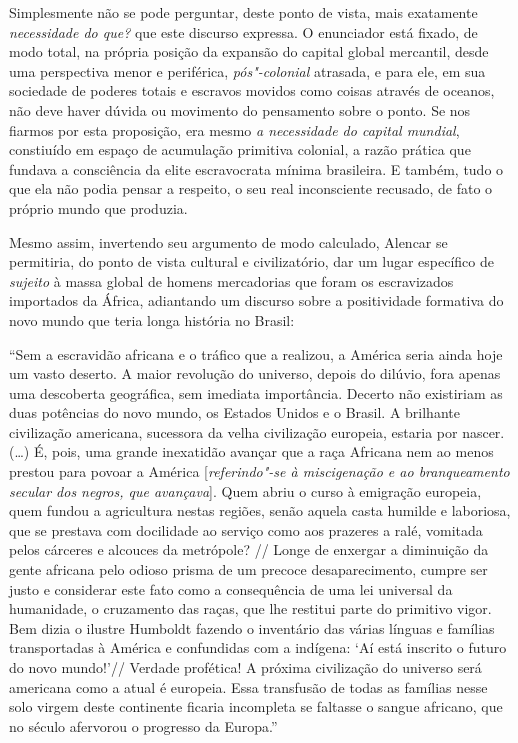 Simplesmente não se pode perguntar, deste ponto de vista, mais
exatamente \emph{necessidade do que?} que este discurso expressa. O
enunciador está fixado, de modo total, na própria posição da expansão do
capital global mercantil, desde uma perspectiva menor e periférica,
\emph{pós"-colonial} atrasada, e para ele, em sua sociedade de poderes
totais e escravos movidos como coisas através de oceanos, não deve haver
dúvida ou movimento do pensamento sobre o ponto. Se nos fiarmos por esta
proposição, era mesmo \emph{a necessidade do capital mundial},
constiuído em espaço de acumulação primitiva colonial, a razão prática
que fundava a consciência da elite escravocrata mínima brasileira. E
também, tudo o que ela não podia pensar a respeito, o seu real
inconsciente recusado, de fato o próprio mundo que produzia.

Mesmo assim, invertendo seu argumento de modo calculado, Alencar se
permitiria, do ponto de vista cultural e civilizatório, dar um lugar
específico de \emph{sujeito} à massa global de homens mercadorias que
foram os escravizados importados da África, adiantando um discurso sobre
a positividade formativa do novo mundo que teria longa história no
Brasil:

``Sem a escravidão africana e o tráfico que a realizou, a América seria
ainda hoje um vasto deserto. A maior revolução do universo, depois do
dilúvio, fora apenas uma descoberta geográfica, sem imediata
importância. Decerto não existiriam as duas potências do novo mundo, os
Estados Unidos e o Brasil. A brilhante civilização americana, sucessora
da velha civilização europeia, estaria por nascer. (\ldots{}) É, pois, uma
grande inexatidão avançar que a raça Africana nem ao menos prestou para
povoar a América {[}\emph{referindo"-se à miscigenação e ao branqueamento
secular dos negros, que avançava}{]}. Quem abriu o curso à emigração
europeia, quem fundou a agricultura nestas regiões, senão aquela casta
humilde e laboriosa, que se prestava com docilidade ao serviço como aos
prazeres a ralé, vomitada pelos cárceres e alcouces da metrópole? //
Longe de enxergar a diminuição da gente africana pelo odioso prisma de
um precoce desaparecimento, cumpre ser justo e considerar este fato como
a consequência de uma lei universal da humanidade, o cruzamento das
raças, que lhe restitui parte do primitivo vigor. Bem dizia o ilustre
Humboldt fazendo o inventário das várias línguas e famílias
transportadas à América e confundidas com a indígena: `Aí está inscrito
o futuro do novo mundo!'// Verdade profética! A próxima civilização do
universo será americana como a atual é europeia. Essa transfusão de
todas as famílias nesse solo virgem deste continente ficaria incompleta
se faltasse o sangue africano, que no século  afervorou o progresso
da Europa.''

